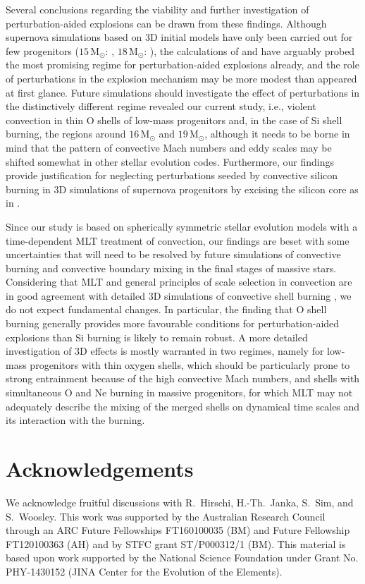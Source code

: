 \documentclass[useAMS,usenatbib]{mnras}
\newcommand{\Msun}{\ensuremath{\mathrm{M}_\odot}}
\begin{document}
Several conclusions regarding the viability and further investigation
of perturbation-aided explosions can be drawn from these findings.
Although supernova simulations based on 3D initial models have only
been carried out for few progenitors ($15 \,\Msun$:
\citealt{couch_15}, $18 \,\Msun$: \citealt{mueller_16b,mueller_17}), the
calculations of \cite{mueller_16b} and \citet{mueller_17} have
arguably probed the most promising regime for perturbation-aided
explosions already, and the role of perturbations in the explosion
mechanism may be more modest than appeared at first glance. Future
simulations should investigate the effect of perturbations in the
distinctively different regime revealed our current study, i.e., violent
convection in thin O shells of low-mass progenitors and, in the case
of Si shell burning, the regions around $16 \,\Msun$ and $19 \,\Msun$,
although it needs to be borne in mind that the pattern of convective
Mach numbers and eddy scales may be shifted somewhat in other stellar
evolution codes.  Furthermore, our findings provide justification for
neglecting perturbations seeded by convective silicon burning in 3D
simulations of supernova progenitors by excising the silicon core as
in \citet{mueller_16c}.

Since our study is based on spherically symmetric stellar evolution
models with a time-dependent MLT treatment of convection, our findings are beset
with some uncertainties that will need to be resolved by future
simulations of convective burning and convective boundary mixing in
the final stages of massive stars. Considering that MLT and general
principles of scale selection in convection are in good agreement with
detailed 3D simulations of convective shell burning
\citep{arnett_09,mueller_16b}, we do not expect fundamental changes.
In particular, the finding that O shell burning generally provides
more favourable conditions for perturbation-aided explosions than Si
burning is likely to remain robust. A more detailed investigation of
3D effects is mostly warranted in two regimes, namely for low-mass
progenitors with thin oxygen shells, which should be particularly
prone to strong entrainment because of the high convective Mach
numbers, and shells with simultaneous O and Ne burning in massive
progenitors, for which MLT may not adequately describe the mixing of
the merged shells on dynamical time scales and its interaction with
the burning.

\section*{Acknowledgements}
We acknowledge fruitful discussions with R.~Hirschi, H.-Th.~Janka,
S.~Sim, and S.~Woosley.  This work was supported by the Australian
Research Council through an ARC Future Fellowships FT160100035 (BM)
and Future Fellowship FT120100363 (AH) and by STFC grant ST/P000312/1
(BM).  This material is based upon work supported by the National
Science Foundation under Grant No. PHY-1430152 (JINA Center for the
Evolution of the Elements).







\label{lastpage}
\end{document}
